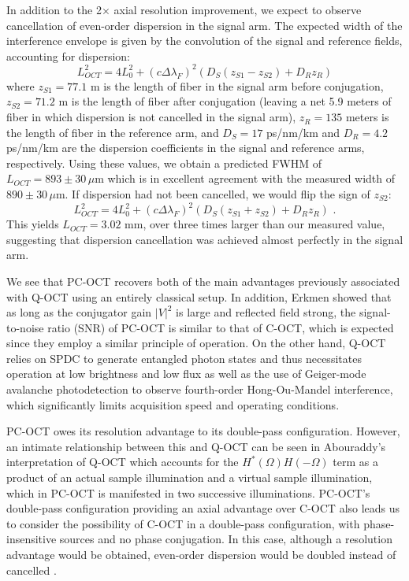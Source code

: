 In addition to the 2$\times$ axial resolution improvement, we expect to observe cancellation of even-order dispersion in the signal arm. The expected width of the interference envelope is given by the convolution of the signal and reference fields, accounting for dispersion:
\begin{equation}
L_{OCT}^2 = 4 L_0^2 + (c \Delta\lambda_F)^2 (D_S (z_{S1}-z_{S2}) + D_R z_R)
\end{equation}
where $z_{S1} = 77.1$ m is the length of fiber in the signal arm before conjugation, $z_{S2} = 71.2$ m is the length of fiber after conjugation (leaving a net 5.9 meters of fiber in which dispersion is not cancelled in the signal arm), $z_R = 135$ meters is the length of fiber in the reference arm, and $D_S = 17$ ps/nm/km and $D_R = 4.2$ ps/nm/km are the dispersion coefficients in the signal and reference arms, respectively. Using these values, we obtain a predicted FWHM of $L_{OCT} = 893 \pm 30\,\mu$m which is in excellent agreement with the measured width of $890 \pm 30\,\mu$m. If dispersion had not been cancelled, we would flip the sign of $z_{S2}$:
\begin{equation}
L_{OCT}^2 = 4 L_0^2 + (c \Delta\lambda_F)^2 (D_S (z_{S1}+z_{S2}) + D_R z_R)\,\,.
\end{equation}
This yields $L_{OCT} = 3.02$ mm, over three times larger than our measured value, suggesting that dispersion cancellation was achieved almost perfectly in the signal arm.

We see that PC-OCT recovers both of the main advantages previously associated with Q-OCT using an entirely classical setup. In addition, Erkmen showed \cite{erkmen-thesis} that as long as the conjugator gain $|V|^2$ is large and reflected field strong, the signal-to-noise ratio (SNR) of PC-OCT is similar to that of C-OCT, which is expected since they employ a similar principle of operation. On the other hand, Q-OCT relies on SPDC to generate entangled photon states and thus necessitates operation at low brightness and low flux as well as the use of Geiger-mode avalanche photodetection to observe fourth-order Hong-Ou-Mandel interference, which significantly limits acquisition speed and operating conditions.

PC-OCT owes its resolution advantage to its double-pass configuration. However, an intimate relationship between this and Q-OCT can be seen in Abouraddy's interpretation of Q-OCT \cite{abouraddy-qoct} which accounts for the $H^*(\Omega)H(-\Omega)$ term as a product of an actual sample illumination and a virtual sample illumination, which in PC-OCT is manifested in two successive illuminations. PC-OCT's double-pass configuration providing an axial advantage over C-OCT also leads us to consider the possibility of C-OCT in a double-pass configuration, with phase-insensitive sources and no phase conjugation. In this case, although a resolution advantage would be obtained, even-order dispersion would be doubled instead of cancelled \cite{erkmen-pcoct}.

